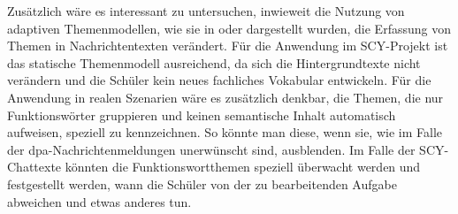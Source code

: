 Zusätzlich wäre es interessant zu untersuchen, inwieweit die Nutzung von adaptiven Themenmodellen, wie sie in \citep{topicsOverTime} oder \citep{onlineLDA} dargestellt wurden, die Erfassung von Themen in Nachrichtentexten verändert. Für die Anwendung im SCY-Projekt ist das statische Themenmodell ausreichend, da sich die Hintergrundtexte nicht verändern und die Schüler kein neues fachliches Vokabular entwickeln. Für die Anwendung in realen Szenarien wäre es zusätzlich denkbar, die Themen, die nur Funktionswörter gruppieren und keinen semantische Inhalt automatisch aufweisen, speziell zu kennzeichnen. So könnte man diese, wenn sie, wie im Falle der dpa-Nachrichtenmeldungen unerwünscht sind, ausblenden. Im Falle der SCY-Chattexte könnten die Funktionswortthemen speziell überwacht werden und festgestellt werden, wann die Schüler von der zu bearbeitenden Aufgabe abweichen und etwas anderes tun. 


